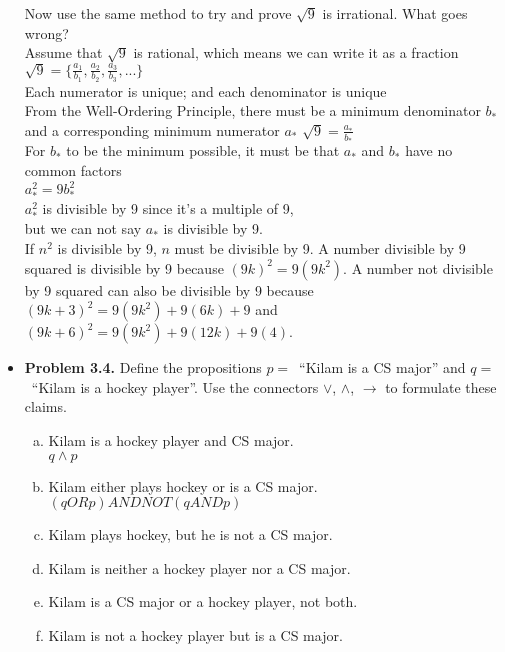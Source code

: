 \documentclass[11pt]{article}
\def\OR{\vee}
\def\AND{\wedge}
\def\imp{\rightarrow}
\begin{document}
\begin{itemize}
  Now use the same method to try and prove $\sqrt{9}$ is irrational.
  What goes wrong?
\\Assume that $\sqrt{9}$ is rational, which means we can write it as a fraction 
\\$\sqrt{9}=\{\frac{a_{1}}{b_{1}},\frac{a_{2}}{b_{2}},\frac{a_{3}}{b_{3}},...\}$
\\Each numerator is unique; and each denominator is unique
\\From the Well-Ordering Principle, there must be a minimum denominator $b_{*}$ 
\\and a corresponding minimum numerator $a_{*}$ \qquad $\sqrt{9}=\frac{a_{*}}{b_{*}}$
\\For $b_{*}$ to be the minimum possible, it must be that $a_{*}$ and $b_{*}$ have no common factors
\\$a_{*}^2=9b_{*}^2$
\\$a_{*}^2$ is divisible by 9 since it's a multiple of 9,
\\but we can not say $a_{*}$ is divisible by 9. 
\\If $n^2$ is divisible by 9, $n$ must be divisible by 9. A number divisible by 9 squared is divisible by 9 because $(9k)^2=9(9k^2)$. A number not divisible by 9 squared can also be divisible by 9 because $(9k+3)^2=9(9k^2)+9(6k)+9$ and $(9k+6)^2=9(9k^2)+9(12k)+9(4)$.

\vspace{0.1in}

\item \textbf{Problem 3.4.}
  Define the propositions $p=$~``Kilam is a CS major''
  and $q=$~``Kilam is a hockey player''.
  Use the connectors $\OR$, $\AND$, $\imp$ to formulate these claims.
  \begin{enumerate}[(a)]
  \item Kilam is a hockey player and CS major.
\\$q\AND p$
  \item Kilam either plays hockey or is a CS major.
\\$(qOR p) AND NOT(qAND p)$
  \item Kilam plays hockey, but he is not a CS major.
  \item Kilam is neither a hockey player nor a CS major.
  \item Kilam is a CS major or a hockey player, not both.
  \item Kilam is not a hockey player but is a CS major.
  \end{enumerate}

\vspace{0.1in}


\end{itemize}
\end{document}

